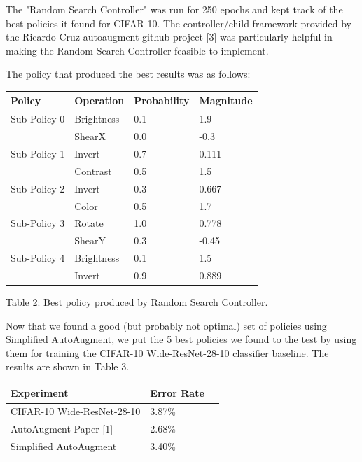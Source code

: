 \documentclass[10pt,twocolumn,letterpaper]{article}
\begin{document}
The "Random Search Controller" was run for 250 epochs and kept track of the best policies it found for CIFAR-10. The controller/child framework provided by the Ricardo Cruz autoaugment github project [3] was particularly helpful in making the Random Search Controller feasible to implement.

The policy that produced the best results was as follows:

        \begin{table}[h]
            \begin{tabular}{llll}
                \hline
                Policy &Operation &Probability&Magnitude   \\ \hline
                Sub-Policy 0 &Brightness &0.1&1.9\\
                &ShearX &0.0 &-0.3\\

                Sub-Policy 1 &Invert &0.7&0.111\\
                &Contrast &0.5 &1.5\\

                Sub-Policy 2 &Invert &0.3&0.667\\
                &Color &0.5 &1.7\\

                Sub-Policy 3 &Rotate &1.0&0.778\\
                &ShearY &0.3 &-0.45\\

                Sub-Policy 4 &Brightness &0.1&1.5\\
                &Invert &0.9 &0.889\\
                \hline
            \end{tabular}
        \end{table}

Table 2: Best policy produced by Random Search Controller.

Now that we found a good (but probably not optimal) set of policies using Simplified AutoAugment, we put the 5 best policies we found to the test by using them for training the CIFAR-10 Wide-ResNet-28-10 classifier baseline.  The results are shown in Table 3.

\vfill\null

    \begin{table}[h]
      \begin{tabular}{lll}
        \hline
        Experiment &Error Rate  \\ \hline
        CIFAR-10 Wide-ResNet-28-10  &3.87\%\\
        AutoAugment Paper [1]  &2.68\% \\
        Simplified AutoAugment &3.40\%\\
        \hline
      \end{tabular}
    \end{table}
\end{document}
